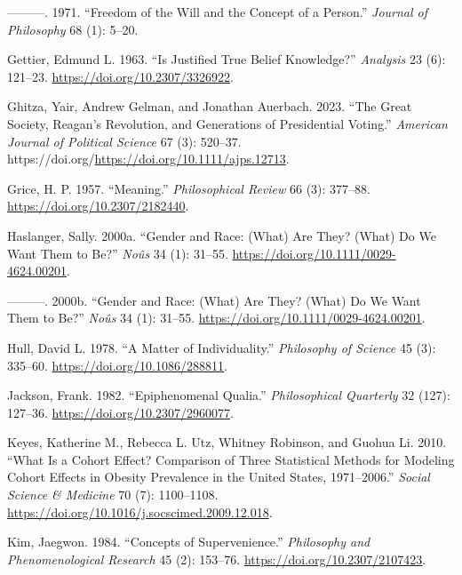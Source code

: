 \documentclass[
  12pt,
  letterpaper,
  DIV=11,
  numbers=noendperiod]{scrartcl}
\newlength{\cslhangindent}
\newenvironment{CSLReferences}[2] %
 {\begin{list}{}{%
  \setlength{\itemindent}{0pt}
  \setlength{\leftmargin}{0pt}
  \setlength{\parsep}{0pt}
  \ifodd #1
   \setlength{\leftmargin}{\cslhangindent}
   \setlength{\itemindent}{-1\cslhangindent}
  \fi
  \setlength{\itemsep}{#2\baselineskip}}}
 {\end{list}}
\begin{document}
\begin{CSLReferences}{1}{0}
---------. 1971. {``Freedom of the Will and the Concept of a Person.''}
\emph{Journal of Philosophy} 68 (1): 5--20.

Gettier, Edmund L. 1963. {``Is Justified True Belief Knowledge?''}
\emph{Analysis} 23 (6): 121--23. \url{https://doi.org/10.2307/3326922}.

Ghitza, Yair, Andrew Gelman, and Jonathan Auerbach. 2023. {``The Great
Society, Reagan's Revolution, and Generations of Presidential Voting.''}
\emph{American Journal of Political Science} 67 (3): 520--37.
https://doi.org/\url{https://doi.org/10.1111/ajps.12713}.

Grice, H. P. 1957. {``Meaning.''} \emph{Philosophical Review} 66 (3):
377--88. \url{https://doi.org/10.2307/2182440}.

Haslanger, Sally. 2000a. {``Gender and Race: (What) Are They? (What) Do
We Want Them to Be?''} \emph{No{û}s} 34 (1): 31--55.
\url{https://doi.org/10.1111/0029-4624.00201}.

---------. 2000b. {``Gender and Race: (What) Are They? (What) Do We Want
Them to Be?''} \emph{Noûs} 34 (1): 31--55.
\url{https://doi.org/10.1111/0029-4624.00201}.

Hull, David L. 1978. {``A Matter of Individuality.''} \emph{Philosophy
of Science} 45 (3): 335--60. \url{https://doi.org/10.1086/288811}.

Jackson, Frank. 1982. {``Epiphenomenal Qualia.''} \emph{Philosophical
Quarterly} 32 (127): 127--36. \url{https://doi.org/10.2307/2960077}.

Keyes, Katherine M., Rebecca L. Utz, Whitney Robinson, and Guohua Li.
2010. {``What Is a Cohort Effect? Comparison of Three Statistical
Methods for Modeling Cohort Effects in Obesity Prevalence in the United
States, 1971--2006.''} \emph{Social Science \& Medicine} 70 (7):
1100--1108. \url{https://doi.org/10.1016/j.socscimed.2009.12.018}.

Kim, Jaegwon. 1984. {``Concepts of Supervenience.''} \emph{Philosophy
and Phenomenological Research} 45 (2): 153--76.
\url{https://doi.org/10.2307/2107423}.


\end{CSLReferences}
\end{document}
